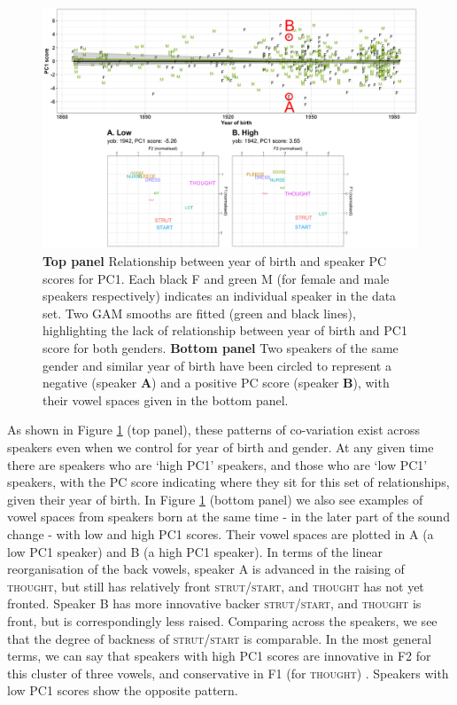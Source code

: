 \documentclass[review]{elsarticle} %
\begin{document}
\begin{figure}[!t]
\includegraphics[width=\textwidth]{Figures/PC1_speaker_loadings_example.png}
\caption{\textbf{Top panel} Relationship between year of birth and speaker PC scores for PC1. Each black F and green M (for female and male speakers respectively) indicates an individual speaker in the data set. Two GAM smooths are fitted (green and black lines), highlighting the lack of relationship between year of birth and PC1 score for both genders. \textbf{Bottom panel} Two speakers of the same gender and similar year of birth have been circled to represent a negative (speaker \textbf{A}) and a positive PC score (speaker \textbf{B}), with their vowel spaces given in the bottom panel.}
\label{fig:PC1_speaker_loadings}
\end{figure}

As shown in Figure \ref{fig:PC1_speaker_loadings} (top panel), these patterns of co-variation exist across speakers even when we control for year of birth and gender.  At any given time there are speakers who are `high PC1' speakers, and those who are `low PC1' speakers, with the PC score indicating where they sit for this set of relationships, given their year of birth.  In Figure \ref{fig:PC1_speaker_loadings} (bottom panel) we also see examples of vowel spaces from speakers born at the same time - in the later part of the sound change - with low and high PC1 scores. Their vowel spaces are plotted in  A (a low PC1 speaker) and B (a high PC1 speaker).  In terms of the linear reorganisation of the back vowels, speaker A is advanced in the raising of \textsc{thought}, but still has relatively front \textsc{strut}/\textsc{start}, and \textsc{thought} has not yet fronted.   Speaker B has more innovative backer \textsc{strut/start}, and \textsc{thought} is front, but is correspondingly less raised.  Comparing across the speakers, we see that the degree of backness of \textsc{strut}/\textsc{start} is comparable.  In the most general terms, we can say that speakers with high PC1 scores are innovative in F2 for this cluster of three vowels, and conservative in F1 (for \textsc{thought}) .  Speakers with low PC1 scores show the opposite pattern.
\end{document}
